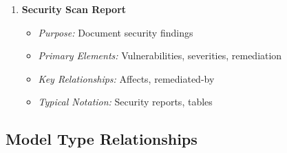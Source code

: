 \documentclass[11pt,letterpaper]{article}
\begin{document}
\begin{enumerate}[label=\textbf{MT\arabic*:}, leftmargin=2.5em]
    \item \textbf{Security Scan Report}
    \begin{itemize}[nosep]
        \item \textit{Purpose:} Document security findings
        \item \textit{Primary Elements:} Vulnerabilities, severities, remediation
        \item \textit{Key Relationships:} Affects, remediated-by
        \item \textit{Typical Notation:} Security reports, tables
    \end{itemize}
\end{enumerate}

\subsection{Model Type Relationships}
\end{document}
